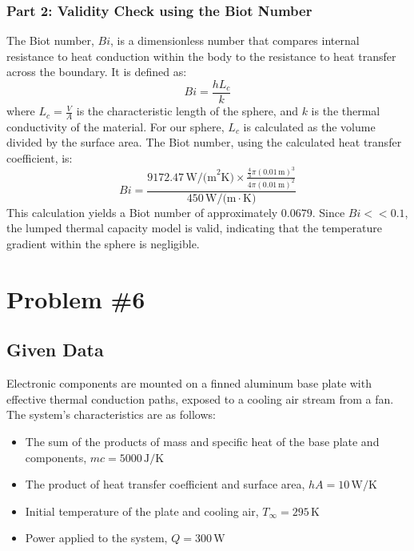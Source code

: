 \documentclass{article}
\numberwithin{equation}{section}
\begin{document}
\subsubsection*{Part 2: Validity Check using the Biot Number}
The Biot number, $Bi$, is a dimensionless number that compares internal resistance to heat conduction within the body to the resistance to heat transfer across the boundary. It is defined as:
\begin{equation}
    Bi = \frac{hL_c}{k}
\end{equation}
where $L_c = \frac{V}{A}$ is the characteristic length of the sphere, and $k$ is the thermal conductivity of the material. For our sphere, $L_c$ is calculated as the volume divided by the surface area.
\newline\newline
The Biot number, using the calculated heat transfer coefficient, is:
\begin{equation}
    Bi = \frac{9172.47 \, \text{W/(m}^2\text{K)} \times \frac{\frac{4}{3}\pi (0.01 \, \text{m})^3}{4\pi (0.01 \, \text{m})^2}}{450 \, \text{W/(m} \cdot \text{K)}}
\end{equation}
\noindent
This calculation yields a Biot number of approximately $0.0679$. Since $Bi << 0.1$, the lumped thermal capacity model is valid, indicating that the temperature gradient within the sphere is negligible.

\newpage
\section{Problem \#6}
\subsection*{Given Data}
Electronic components are mounted on a finned aluminum base plate with effective thermal conduction paths, exposed to a cooling air stream from a fan. The system's characteristics are as follows:
\begin{itemize}
    \item The sum of the products of mass and specific heat of the base plate and components, $mc = 5000 \, \text{J/K}$
    \item The product of heat transfer coefficient and surface area, $hA = 10 \, \text{W/K}$
    \item Initial temperature of the plate and cooling air, $T_{\infty} = 295 \, \text{K}$
    \item Power applied to the system, $Q = 300 \, \text{W}$
\end{itemize}
\end{document}
